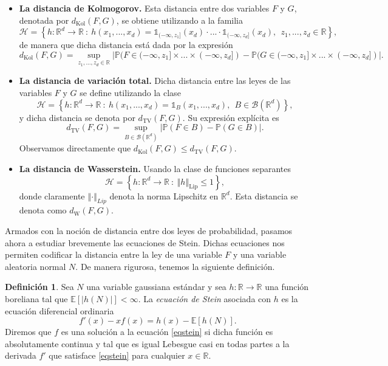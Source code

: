 \documentclass[letterpaper,twoside,12pt]{book}
\newcommand{\R}{\mathbb{R}}
\newcommand{\B}{\mathcal{B}}
\newcommand{\E}{\mathbb{E}}
\renewcommand{\P}{\mathbb{P}}
\newcommand{\1}{\mathds{1}}
\newcommand{\abs}[1]{\left\lvert #1 \right\rvert}
\renewcommand{\to}{\rightarrow}
\newcommand{\norm}[1]{\left\Vert #1 \right\Vert}
\theoremstyle{definition}
\newtheorem{dfn}{Definición}
\theoremstyle{definition}
\theoremstyle{remark}
\theoremstyle{definition}
\theoremstyle{definition}
\theoremstyle{definition}
\theoremstyle{definition}
\theoremstyle{definition}
\begin{document}
\begin{itemize}
   \item \textbf{La distancia de Kolmogorov.} Esta distancia entre dos variables $F$ y $G$, denotada por $d_{\text{Kol}}(F,G)$, se obtiene utilizando a la familia \[\mathscr{H}= \left\{h:\R^d\to \R \ :\ h(x_1,...,x_d)=\1_{(-\infty,z_1]}(x_d)\cdot ... \cdot \1_{(-\infty,z_d]}(x_d), \ \  z_1,...,z_d\in \R\right\},\]
   de manera que dicha distancia está dada por la expresión
   \[
   d_{\text{Kol}}(F,G)=\sup_{z_1,...,z_d\in \R}\abs{\P(F\in (-\infty,z_1]\times...\times(-\infty,z_d])-\P(G\in (-\infty,z_1]\times...\times(-\infty,z_d])}.
   \]
   \item \textbf{La distancia de variación total.} Dicha distancia entre las leyes de las variables $F$ y $G$ se define utilizando la clase \[\mathscr{H}=\left\{h:\R^d\to \R \ :\ h(x_1,...,x_d)=\1_B(x_1,...,x_d), \ \ B\in \B(\R^{d})\right\},\] 
   y dicha distancia se denota por $d_{\text{TV}}(F,G).$ Su expresión explícita es 
   \[
      d_{\text{TV}}(F,G)= \sup_{B\in \B(\R^{d})}\abs{\P(F\in B)-\P(G\in B)}.
   \]
   Observamos directamente que $d_{\text{Kol}}(F,G)\leq d_{\text{TV}}(F,G)$.
   \item \textbf{La distancia de Wasserstein.} Usando la clase de funciones separantes \[\mathscr{H}=\left\{h:\R^{d}\to \R \ :\ \norm{h}_{\text{Lip}}\leq 1\right\},\] donde claramente $\norm{\cdot}_{Lip}$ denota la norma Lipschitz en $\R^{d}$. Esta distancia se denota como $d_{\text{W}}(F,G)$.
\end{itemize}

Armados con la noción de distancia entre dos leyes de probabilidad, pasamos ahora a estudiar brevemente las ecuaciones de Stein. Dichas ecuaciones nos permiten codificar la distancia entre la ley de una variable $F$ y una variable aleatoria normal $N$. De manera rigurosa, tenemos la siguiente definición.

\begin{dfn} 
 Sea $N$ una variable gaussiana estándar y sea $h:\R\to\R$ una función boreliana tal que $\E\left[\abs{h(N)}\right]<\infty$. La \textit{ecuación de Stein} asociada con $h$ es la ecuación diferencial ordinaria 
 \begin{equation}\label{eqstein}
   f'(x)-xf(x)=h(x)-\E\left[h(N)\right].
 \end{equation}
 Diremos que $f$ es una solución a la ecuación \eqref{eqstein} si dicha función es absolutamente continua y tal que es igual Lebesgue casi en todas partes a la derivada $f'$ que satisface \eqref{eqstein} para cualquier $x\in \R$.
 \end{dfn}
\end{document}
